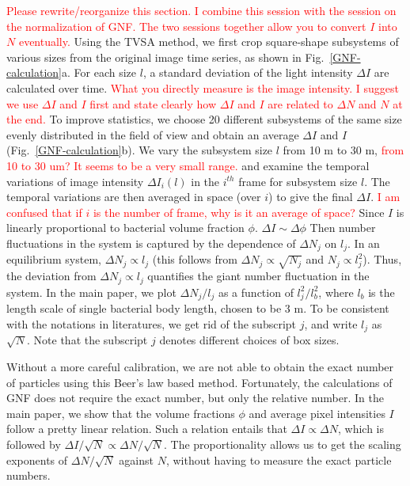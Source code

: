 \documentclass[twocolumn,aps,prx,amsmath,amssymb,longbibliography]{revtex4-2}
\begin{document}
\textcolor{red}{Please rewrite/reorganize this section. I combine this session with the session on the normalization of GNF. The two sessions together allow you to convert $I$ into $N$ eventually.}
Using the TVSA method, we first crop square-shape subsystems of various sizes from the original image time series, as shown in Fig.~\ref{GNF-calculation}a. For each size $l$, a standard deviation of the light intensity $\Delta I$ are calculated over time. \textcolor{red}{What you directly measure is the image intensity. I suggest we use $\Delta I$ and $I$ first and state clearly how $\Delta I$ and $I$ are related to $\Delta N$ and $N$ at the end.} To improve statistics, we choose 20 different subsystems of the same size evenly distributed in the field of view and obtain an average $\Delta I$ and $I$  (Fig.~\ref{GNF-calculation}b). We vary the subsystem size $l$ from 10 \textmu m to 30 \textmu m, \textcolor{red}{from 10 to 30 um? It seems to be a very small range.} and examine the temporal variations of image intensity $\Delta I_{i}(l)$ in the $i^{th}$ frame for subsystem size $l$. The temporal variations are then averaged in space (over $i$) to give the final $\Delta I$. \textcolor{red}{I am confused that if $i$ is the number of frame, why is it an average of space?} Since $I$ is linearly proportional to bacterial volume fraction $\phi$. $\Delta I \sim \Delta \phi$
Then number fluctuations in the system is captured by the dependence of $\Delta N_{j}$ on $l_j$. In an equilibrium system, $\Delta N_{j}\propto l_j$ (this follows from $\Delta N_{j}\propto \sqrt{N_j}$ and $N_j\propto l_j^2$).
Thus, the deviation from $\Delta N_{j}\propto l_j$ quantifies the giant number fluctuation in the system.
In the main paper, we plot $\Delta N_{j}/l_j$ as a function of $l_j^2/l_b^2$, where $l_b$ is the length scale of single bacterial body length, chosen to be 3 \textmu m.
To be consistent with the notations in literatures, we get rid of the subscript $j$, and write $l_j$ as $\sqrt{N}$.
Note that the subscript $j$ denotes different choices of box sizes.

Without a more careful calibration, we are not able to obtain the exact number of particles using this Beer's law based method. Fortunately, the calculations of GNF does not require the exact number, but only the relative number. In the main paper, we show that the volume fractions $\phi$ and average pixel intensities $I$ follow a pretty linear relation. Such a relation entails that $\Delta I \propto \Delta N$, which is followed by $\Delta I/\sqrt N \propto \Delta N/\sqrt N$. The proportionality allows us to get the scaling exponents of $\Delta N/\sqrt N$ against $N$, without having to measure the exact particle numbers.
\end{document}
